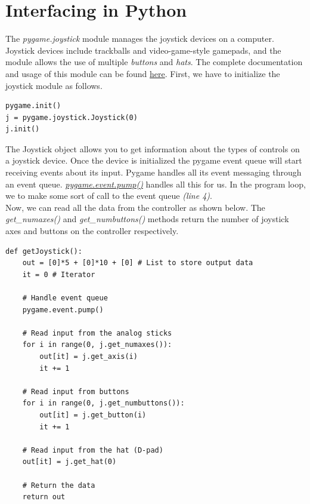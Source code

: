 \documentclass[a4paper,12pt,oneside]{book}
\begin{document}
\clearpage

\section{Interfacing in Python}
The \textit{pygame.joystick} module manages the joystick devices on a computer. Joystick devices include trackballs and video-game-style gamepads, and the module allows the use of multiple \textit{buttons} and \textit{hats}. The complete documentation and usage of this module can be found \href{https://www.pygame.org/docs/ref/joystick.html}{here}. First, we have to initialize the joystick module as follows.\\

\begin{verbatim}
pygame.init()
j = pygame.joystick.Joystick(0)
j.init()
\end{verbatim}

\bigskip

The Joystick object allows you to get information about the types of controls on a joystick device. Once the device is initialized the pygame event queue will start receiving events about its input. Pygame handles all its event messaging through an event queue. \href{https://www.pygame.org/docs/ref/event.html#pygame.event.pump}{\textit{pygame.event.pump()}} handles all this for us. In the program loop, we to make some sort of call to the event queue \textit{(line 4)}.\\

Now, we can read all the data from the controller as shown below. The \textit{get{\_}numaxes()} and \textit{get{\_}numbuttons()} methods return the number of joystick axes and buttons on the controller respectively.\\

\begin{verbatim}
def getJoystick():
    out = [0]*5 + [0]*10 + [0] # List to store output data
    it = 0 # Iterator
    
    # Handle event queue
    pygame.event.pump()
    
    # Read input from the analog sticks       
    for i in range(0, j.get_numaxes()):
        out[it] = j.get_axis(i)
        it += 1
        
    # Read input from buttons
    for i in range(0, j.get_numbuttons()):
        out[it] = j.get_button(i)
        it += 1
	
    # Read input from the hat (D-pad)
    out[it] = j.get_hat(0)
    
    # Return the data 
    return out
\end{verbatim}
\end{document}
